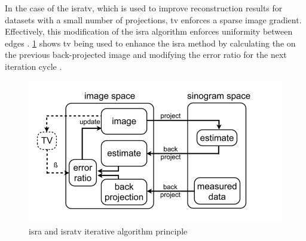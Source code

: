 In the case of the \gls{isratv}, which is used to improve reconstruction results for datasets with a small number of projections,
\acrfull{tv} enforces a sparse image gradient.
Effectively, this modification of the \gls{isra} algorithm enforces uniformity between edges \cite{vandeghinsteLowDoseMicroCTImaging2013}.
\cref{fig:isra} shows \acrshort{tv} being used to enhance the \gls{isra} method by
calculating the  on the previous back-projected image and modifying the error ratio for the next iteration cycle \cite{vandeghinsteLowDoseMicroCTImaging2013}.
\begin{figure}[h]
	\centerline{
		\includegraphics[scale=0.5]{images/isra.png}}
	\caption{\gls{isra} and \gls{isratv} iterative algorithm principle \cite{vandeghinsteLowDoseMicroCTImaging2013}}\label{fig:isra}
\end{figure}

